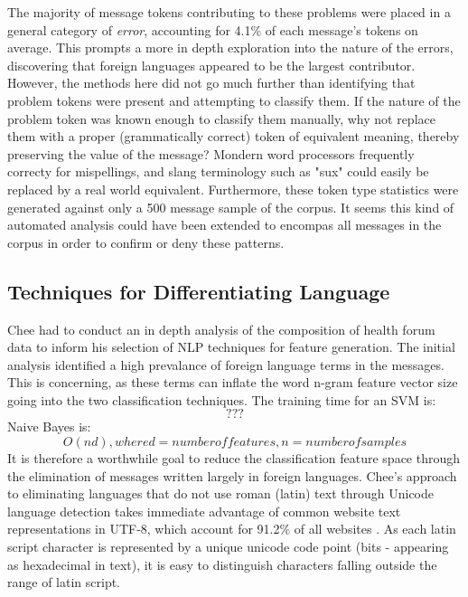 \documentclass[twoside,11pt]{article}
\begin{document}
The majority of message tokens contributing to these problems were placed in a general category of \textit{error}, accounting for 4.1\% of each message's tokens on average. This prompts a more in depth exploration into the nature of the errors, discovering that foreign languages appeared to be the largest contributor. However, the methods here did not go much further than identifying that problem tokens were present and attempting to classify them. If the nature of the problem token was known enough to classify them manually, why not replace them with a proper (grammatically correct) token of equivalent meaning, thereby preserving the value of the message? Mondern word processors frequently correcty for mispellings, and slang terminology such as "sux" could easily be replaced by a real world equivalent. Furthermore, these token type statistics were generated against only a 500 message sample of the corpus. It seems this kind of automated analysis could have been extended to encompas all messages in the corpus in order to confirm or deny these patterns.



\subsection{Techniques for Differentiating Language}
Chee had to conduct an in depth analysis of the composition of health forum data to inform his selection of NLP techniques for feature generation. The initial analysis identified a high prevalance of foreign language terms in the messages. This is concerning, as these terms can inflate the word n-gram feature vector size going into the two classification techniques. The training time for an SVM is:
\[
???
\]
Naive Bayes is:
\[
  O(nd), where d = number of features, n = number of samples

\]
It is therefore a worthwhile goal to reduce the classification feature space through the elimination of messages written largely in foreign languages. Chee's approach to eliminating languages that do not use roman (latin) text through Unicode language detection takes immediate advantage of common website text representations in UTF-8, which account for 91.2\% of all websites \citep{UTF-8 article on wikipedia}. As each latin script character is represented by a unique unicode code point (bits - appearing as hexadecimal in text), it is easy to distinguish characters falling outside the range of latin script.
\end{document}
